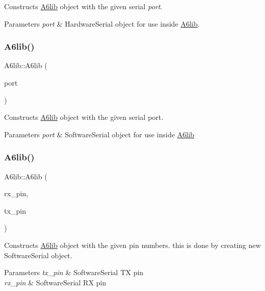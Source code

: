 Constructs \mbox{\hyperlink{class_a6lib}{A6lib}} object with the given serial {\itshape port}. 
\begin{DoxyParams}{Parameters}
{\em port} & Hardware\+Serial object for use inside \mbox{\hyperlink{class_a6lib}{A6lib}}. \\
\hline
\end{DoxyParams}
\mbox{\label{class_a6lib_a415ffc3dc0178a4ee8fdf3e718ef14a9}} 
\subsubsection{\texorpdfstring{A6lib()}{A6lib()}\hspace{0.1cm}{\footnotesize\ttfamily [2/3]}}
{\footnotesize\ttfamily A6lib\+::\+A6lib (\begin{DoxyParamCaption}\item[{Software\+Serial $\ast$}]{port }\end{DoxyParamCaption})}

Constructs \mbox{\hyperlink{class_a6lib}{A6lib}} object with the given serial port. 
\begin{DoxyParams}{Parameters}
{\em port} & Software\+Serial object for use inside \mbox{\hyperlink{class_a6lib}{A6lib}} \\
\hline
\end{DoxyParams}
\mbox{\label{class_a6lib_a318fb5617771079545af012b28f6a1e7}} 
\subsubsection{\texorpdfstring{A6lib()}{A6lib()}\hspace{0.1cm}{\footnotesize\ttfamily [3/3]}}
{\footnotesize\ttfamily A6lib\+::\+A6lib (\begin{DoxyParamCaption}\item[{uint8\+\_\+t}]{rx\+\_\+pin,  }\item[{uint8\+\_\+t}]{tx\+\_\+pin }\end{DoxyParamCaption})}

Constructs \mbox{\hyperlink{class_a6lib}{A6lib}} object with the given pin numbers. this is done by creating new Software\+Serial object. 
\begin{DoxyParams}{Parameters}
{\em tx\+\_\+pin} & Software\+Serial TX pin \\
\hline
{\em rx\+\_\+pin} & Software\+Serial RX pin \\
\hline
\end{DoxyParams}
\mbox{\label{class_a6lib_aac4fbb7021b2f1741b01d72b606d5081}} 
